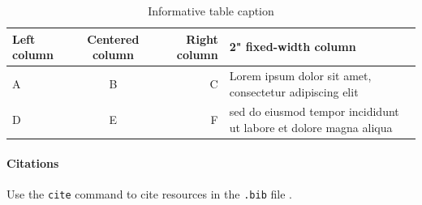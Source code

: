 \begin{table}[H]
    \centering
    \caption{Informative table caption}

    \begin{tabular}{|l|cr|p{2in}|} 

        \hline Left column & Centered column & Right column & 2" fixed-width
        column \\
        \hline A & B & C & Lorem ipsum dolor sit amet, consectetur adipiscing elit \\
        \hline D & E & F & sed do eiusmod tempor incididunt ut labore et
        dolore magna aliqua \\
        \hline %
    \end{tabular}	
    \label{tbl:example-table}
\end{table}	

\paragraph{Citations} Use the \verb|cite| command to cite resources in the
\verb|.bib| file \cite{peyret2012computational, oates1997aerothermodynamics}.
